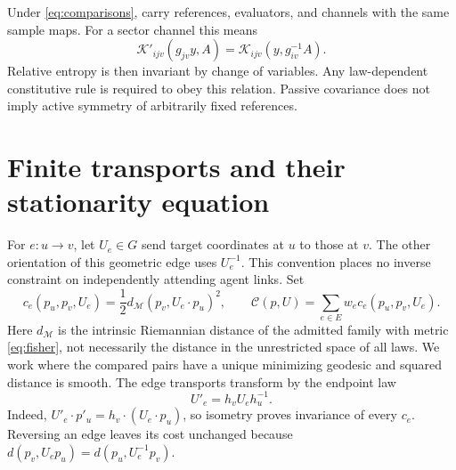 \documentclass[11pt]{article}
\newcommand{\M}{\mathcal M}
\begin{document}
Under \eqref{eq:comparisons}, carry references, evaluators, and channels with the same sample maps. For a sector channel this means
\begin{equation}
 \mathcal K'_{ijv}(g_{jv}y,A)
 =\mathcal K_{ijv}(y,g_{iv}^{-1}A).
\end{equation}
Relative entropy is then invariant by change of variables. Any law-dependent constitutive rule is required to obey this relation. Passive covariance does not imply active symmetry of arbitrarily fixed references.

\section{Finite transports and their stationarity equation}

For $e:u\to v$, let $U_e\in G$ send target coordinates at $u$ to those at $v$. The other orientation of this geometric edge uses $U_e^{-1}$. This convention places no inverse constraint on independently attending agent links. Set
\begin{equation}
 c_e(p_u,p_v,U_e)=\frac12 d_{\M}(p_v,U_e\cdot p_u)^2,
 \qquad
 \mathcal C(p,U)=\sum_{e\in E}w_e c_e(p_u,p_v,U_e).
 \label{eq:C}
\end{equation}
Here $d_{\M}$ is the intrinsic Riemannian distance of the admitted family with metric \eqref{eq:fisher}, not necessarily the distance in the unrestricted space of all laws. We work where the compared pairs have a unique minimizing geodesic and squared distance is smooth. The edge transports transform by the endpoint law
\begin{equation}
 U'_e=h_vU_eh_u^{-1}.
 \label{eq:endpoint}
\end{equation}
Indeed, $U'_e\cdot p'_u=h_v\cdot(U_e\cdot p_u)$, so isometry proves invariance of every $c_e$. Reversing an edge leaves its cost unchanged because
$d(p_v,U_ep_u)=d(p_u,U_e^{-1}p_v)$.
\end{document}
